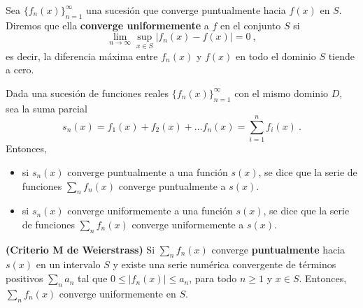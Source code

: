 \begin{defi}
    Sea $\{ f_n(x) \}_{n=1}^\infty$ una sucesión que converge puntualmente hacia $f(x)$ en $S$. Diremos que ella \textbf{converge uniformemente} a $f$ en el conjunto $S$ si 
    \begin{equation}
        \lim_{n \to \infty} \sup_{x \in S} |f_n(x) - f(x)| = 0 \ ,
    \end{equation} 
    es decir, la diferencia máxima entre $f_n(x)$ y $f(x)$ en todo el dominio $S$ tiende a cero.
\end{defi}

Dada una sucesión de funciones reales $\{ f_n(x) \}_{n=1}^\infty$ con el mismo dominio $D$, sea la suma parcial 
\begin{equation*}
    s_n(x) = f_1(x) + f_2(x) + \dots f_n(x) = \sum_{i=1}^n f_i(x) \ .
\end{equation*}
Entonces,
\begin{itemize}
    \item si $s_n(x)$ converge puntualmente a una función $s(x)$, se dice que la serie de funciones $\sum\limits_n f_n(x)$ converge puntualmente a $s(x)$.
    \item si $s_n(x)$ converge uniformemente a una función $s(x)$, se dice que la serie de funciones $\sum\limits_n f_n(x)$ converge uniformemente a $s(x)$.
\end{itemize}

\begin{defi}{\textbf{(Criterio M de Weierstrass)}}
    Si $\sum\limits_n f_n(x)$ converge \textbf{puntualmente} hacia $s(x)$ en un intervalo $S$ y existe una serie numérica convergente de términos positivos $\sum\limits_n a_n$ tal que $0 \leq |f_n(x)| \leq a_n$, para todo $n \geq 1$ y $x \in S$. Entonces, $\sum\limits_n f_n(x)$ converge uniformemente en $S$.
\end{defi}

